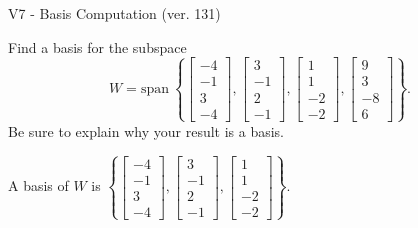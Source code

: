 \begin{exercise}
  \begin{exerciseTitle}V7 - Basis Computation (ver. 131)\end{exerciseTitle}
  \begin{exerciseStatement}
    Find a basis for the subspace 
\[W=\mathrm{span}\ \left\{\left[\begin{array}{r}
-4 \\
-1 \\
3 \\
-4
\end{array}\right] , \left[\begin{array}{r}
3 \\
-1 \\
2 \\
-1
\end{array}\right] , \left[\begin{array}{r}
1 \\
1 \\
-2 \\
-2
\end{array}\right] , \left[\begin{array}{r}
9 \\
3 \\
-8 \\
6
\end{array}\right]\right\}.\]
 Be sure to explain why your result is a basis.


  \end{exerciseStatement}
  \begin{exerciseAnswer}
   A basis of \(W\) is  \(\left\{\left[\begin{array}{r}
-4 \\
-1 \\
3 \\
-4
\end{array}\right] , \left[\begin{array}{r}
3 \\
-1 \\
2 \\
-1
\end{array}\right] , \left[\begin{array}{r}
1 \\
1 \\
-2 \\
-2
\end{array}\right]\right\}\).
  


  \end{exerciseAnswer}
\end{exercise}